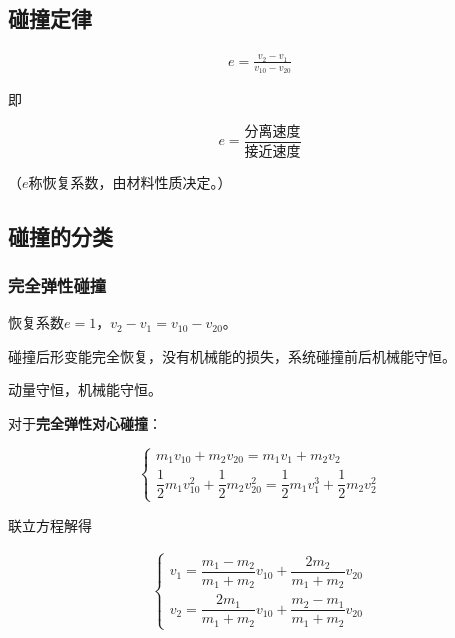 \documentclass[
	12pt, %
	a4paper, %
]{myLegrandOrangeBook}
\begin{document}
    \subsection{碰撞定律}

    \begin{theorem}[碰撞定律]

        \begin{align}
            e = \frac{v_2 - v_1}{v_{10} - v_{20}}
        \end{align}

        即

        $$
        e = \frac{\text{分离速度}}{\text{接近速度}}
        $$

        （\(e\)称恢复系数，由材料性质决定。）

    \end{theorem}

    \subsection{碰撞的分类}

    \subsubsection*{完全弹性碰撞}

    恢复系数\(e=1\)，\(v_2-v_1=v_{10} - v_{20}\)。

    碰撞后形变能完全恢复，没有机械能的损失，系统碰撞前后机械能守恒。

    动量守恒，机械能守恒。

    对于\textbf{完全弹性对心碰撞}：

    $$
        \left\{\begin{array}{l}
        m_1 v_{10}+m_2 v_{20}=m_1 v_1+m_2 v_2 \\
        \dfrac{1}{2} m_1 v_{10}^2+\dfrac{1}{2} m_2 v_{20}^2=\dfrac{1}{2} m_1 v_1^3+\dfrac{1}{2} m_2 v_2^2
        \end{array}\right.
    $$

    联立方程解得

    \begin{align}
        \left\{\begin{array}{l}
            v_1=\dfrac{m_1-m_2}{m_1+m_2} v_{10}+\dfrac{2 m_2}{m_1+m_2} v_{20} \\
            v_2=\dfrac{2 m_1}{m_1+m_2} v_{10}+\dfrac{m_2-m_1}{m_1+m_2} v_{20}
        \end{array}\right.
    \end{align}
\end{document}
